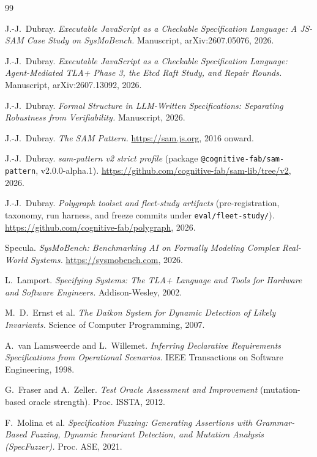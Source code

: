 \documentclass[11pt]{article}
\begin{document}
\begin{thebibliography}{99}

 J.-J.\ Dubray. \emph{Executable JavaScript as a Checkable
Specification Language: A JS-SAM Case Study on SysMoBench.} Manuscript,
arXiv:2607.05076, 2026.

 J.-J.\ Dubray. \emph{Executable JavaScript as a Checkable
Specification Language: Agent-Mediated TLA+ Phase 3, the Etcd Raft Study, and
Repair Rounds.} Manuscript, arXiv:2607.13092, 2026.

 J.-J.\ Dubray. \emph{Formal Structure in LLM-Written
Specifications: Separating Robustness from Verifiability.} Manuscript, 2026.

 J.-J.\ Dubray. \emph{The SAM Pattern.} \url{https://sam.js.org},
2016 onward.

 J.-J.\ Dubray. \emph{sam-pattern v2 strict profile} (package
\texttt{@cognitive-fab/sam-pattern}, v2.0.0-alpha.1).
\url{https://github.com/cognitive-fab/sam-lib/tree/v2}, 2026.

 J.-J.\ Dubray. \emph{Polygraph toolset and fleet-study artifacts}
(pre-registration, taxonomy, run harness, and freeze commits under
\texttt{eval/fleet-study/}). \url{https://github.com/cognitive-fab/polygraph}, 2026.

 Specula. \emph{SysMoBench: Benchmarking AI on Formally
Modeling Complex Real-World Systems.} \url{https://sysmobench.com}, 2026.

 L.\ Lamport. \emph{Specifying Systems: The TLA+ Language and
Tools for Hardware and Software Engineers.} Addison-Wesley, 2002.

 M.\ D.\ Ernst et al. \emph{The Daikon System for Dynamic
Detection of Likely Invariants.} Science of Computer Programming, 2007.

 A.\ van Lamsweerde and L.\ Willemet. \emph{Inferring
Declarative Requirements Specifications from Operational Scenarios.} IEEE
Transactions on Software Engineering, 1998.

 G.\ Fraser and A.\ Zeller. \emph{Test Oracle Assessment and
Improvement} (mutation-based oracle strength). Proc. ISSTA, 2012.

 F.\ Molina et al. \emph{Specification Fuzzing: Generating
Assertions with Grammar-Based Fuzzing, Dynamic Invariant Detection, and
Mutation Analysis (SpecFuzzer).} Proc. ASE, 2021.


\end{thebibliography}
\end{document}
